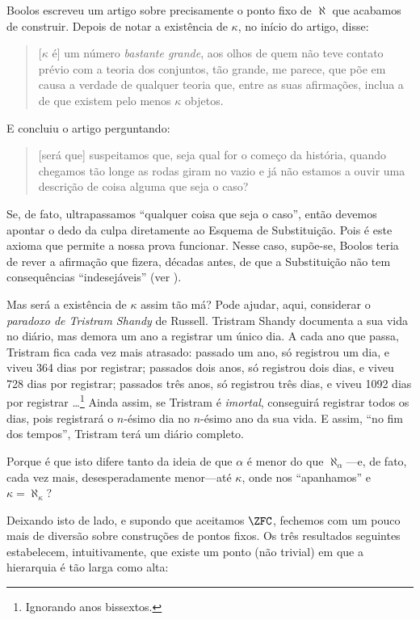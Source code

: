 \documentclass[../../../include/open-logic-section]{subfiles}
\begin{document}
Boolos escreveu um artigo sobre precisamente o ponto fixo de $\aleph$ que
acabamos de construir. Depois de notar a existência de $\kappa$, no início
do artigo, disse:
\begin{quote}
	[$\kappa$ é] um número \emph{bastante grande}, aos olhos de quem
	não teve contato prévio com a teoria dos conjuntos, tão grande, me parece,
	que põe em causa a verdade de qualquer teoria que, entre as suas
	afirmações, inclua a de que existem pelo menos $\kappa$ objetos.
	\citep[p.~257]{Boolos2000}
\end{quote}
E concluiu o artigo perguntando:
\begin{quote}
	[será que] suspeitamos que, seja qual for o começo da história,
	quando chegamos tão longe as rodas giram no vazio e já não estamos a ouvir
	uma descrição de coisa alguma que seja o caso?
	\citep[p.~268]{Boolos2000}
\end{quote}
Se, de fato, ultrapassamos ``qualquer coisa que seja o caso'', então devemos
apontar o dedo da culpa diretamente ao Esquema de Substituição. Pois é este
axioma que permite a nossa prova funcionar. Nesse caso, supõe-se,
Boolos teria de rever a afirmação que fizera, décadas antes,
de que a Substituição não tem consequências ``indesejáveis'' (ver
).

Mas será a existência de $\kappa$ assim tão má? Pode ajudar, aqui,
considerar o \emph{paradoxo de Tristram Shandy} de Russell. Tristram Shandy
documenta a sua vida no diário, mas demora um ano a registrar um
único dia. A cada ano que passa, Tristram fica cada vez mais
atrasado: passado um ano, só registrou um dia, e viveu 364 dias por registrar; passados dois anos, só registrou
dois dias, e viveu 728 dias por registrar; passados três anos, só
registrou três dias, e viveu 1092 dias por registrar
\dots\footnote{Ignorando anos bissextos.} Ainda assim, se Tristram
é \emph{imortal}, conseguirá registrar todos os dias, pois
registrará o $n$-ésimo dia no $n$-ésimo ano da sua vida. E assim, ``no
fim dos tempos'', Tristram terá um diário completo. 

Porque é que isto difere tanto da ideia de que $\alpha$ é
menor do que $\aleph_\alpha$---e, de fato, cada vez mais, desesperadamente
menor---até $\kappa$, onde nos ``apanhamos'' e $\kappa
= \aleph_\kappa$?

Deixando isto de lado, e supondo que aceitamos $\ZFC$, fechemos com um
pouco mais de diversão sobre construções de pontos fixos. Os três resultados seguintes estabelecem, intuitivamente, que existe um ponto (não trivial) em
que a hierarquia é tão larga como alta:
\end{document}
